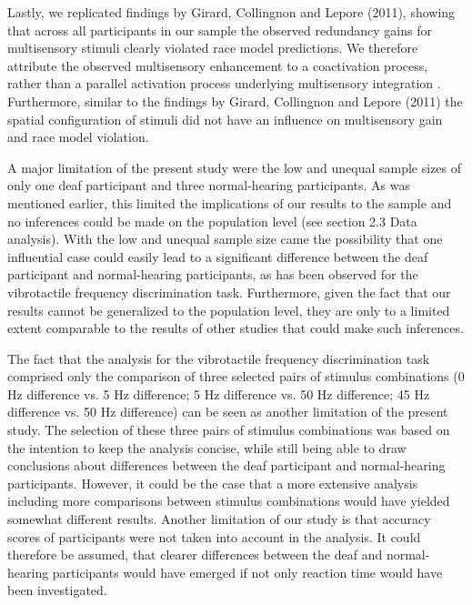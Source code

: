 \documentclass[12pt]{article}
\begin{document}
\par Lastly, we replicated findings by Girard, Collingnon and Lepore (2011), showing that across all participants in our sample the observed redundancy gains for multisensory stimuli clearly violated race model predictions. We therefore attribute the observed multisensory enhancement to a coactivation process, rather than a parallel activation process underlying multisensory integration \parencite{miller_divided_1982,miller_timecourse_1986,ulrich_testing_2007}. Furthermore, similar to the findings by Girard, Collingnon and Lepore (2011) the spatial configuration of stimuli did not have an influence on multisensory gain and race model violation. 
%
\par A major limitation of the present study were the low and unequal sample sizes of only one deaf participant and three normal-hearing participants. As was mentioned earlier, this limited the implications of our results to the sample and no inferences could be made on the population level (see section 2.3 Data analysis). With the low and unequal sample size came the possibility that one influential case could easily lead to a significant difference between the deaf participant and normal-hearing participants, as has been observed for the vibrotactile frequency discrimination task. Furthermore, given the fact that our results cannot be generalized to the population level, they are only to a limited extent comparable to the results of other studies that could make such inferences.
%
\par The fact that the analysis for the vibrotactile frequency discrimination task comprised only the comparison of three selected pairs of stimulus combinations (0 Hz difference vs. 5 Hz difference; 5 Hz difference vs. 50 Hz difference; 45 Hz difference vs. 50 Hz difference) can be seen as another limitation of the present study. The selection of these three pairs of stimulus combinations was based on the intention to keep the analysis concise, while still being able to draw conclusions about differences between the deaf participant and normal-hearing participants. However, it could be the case that a more extensive analysis including more comparisons between stimulus combinations would have yielded somewhat different results. Another limitation of our study is that accuracy scores of participants were not taken into account in the analysis. It could therefore be assumed, that clearer differences between the deaf and normal-hearing participants would have emerged if not only reaction time would have been investigated. 
\end{document}
